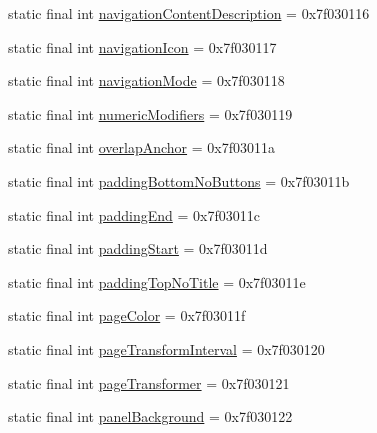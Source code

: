 \begin{DoxyCompactItemize}
\item 
static final int \mbox{\hyperlink{classcom_1_1synnapps_1_1carouselview_1_1_r_1_1attr_a1cccf2566caebbe24264f9612d349a97}{navigation\+Content\+Description}} = 0x7f030116
\item 
static final int \mbox{\hyperlink{classcom_1_1synnapps_1_1carouselview_1_1_r_1_1attr_afcef34f3a69b717d8b25b8b8f076a22e}{navigation\+Icon}} = 0x7f030117
\item 
static final int \mbox{\hyperlink{classcom_1_1synnapps_1_1carouselview_1_1_r_1_1attr_a32f5238c8f67156e168368e807610438}{navigation\+Mode}} = 0x7f030118
\item 
static final int \mbox{\hyperlink{classcom_1_1synnapps_1_1carouselview_1_1_r_1_1attr_aa764b72f4befa2ab6bf5b78f48c212eb}{numeric\+Modifiers}} = 0x7f030119
\item 
static final int \mbox{\hyperlink{classcom_1_1synnapps_1_1carouselview_1_1_r_1_1attr_a243a2a854618c4dfd1e6d94cf8fc0c34}{overlap\+Anchor}} = 0x7f03011a
\item 
static final int \mbox{\hyperlink{classcom_1_1synnapps_1_1carouselview_1_1_r_1_1attr_a9daf774ba2e974a2fe439af281278aab}{padding\+Bottom\+No\+Buttons}} = 0x7f03011b
\item 
static final int \mbox{\hyperlink{classcom_1_1synnapps_1_1carouselview_1_1_r_1_1attr_a7437756496643c845f45a08604ef8764}{padding\+End}} = 0x7f03011c
\item 
static final int \mbox{\hyperlink{classcom_1_1synnapps_1_1carouselview_1_1_r_1_1attr_a8b1c537a481b956fb330179dbc36d745}{padding\+Start}} = 0x7f03011d
\item 
static final int \mbox{\hyperlink{classcom_1_1synnapps_1_1carouselview_1_1_r_1_1attr_a919a133f0bf47b507c227317f190bea2}{padding\+Top\+No\+Title}} = 0x7f03011e
\item 
static final int \mbox{\hyperlink{classcom_1_1synnapps_1_1carouselview_1_1_r_1_1attr_ade0bad39eca01caf7a0c2f3b3158f274}{page\+Color}} = 0x7f03011f
\item 
static final int \mbox{\hyperlink{classcom_1_1synnapps_1_1carouselview_1_1_r_1_1attr_ab501f7de0fdb2c9f03d2f8a0ae52e71c}{page\+Transform\+Interval}} = 0x7f030120
\item 
static final int \mbox{\hyperlink{classcom_1_1synnapps_1_1carouselview_1_1_r_1_1attr_a53e152739d0b92db31d3ceb44bcafe42}{page\+Transformer}} = 0x7f030121
\item 
static final int \mbox{\hyperlink{classcom_1_1synnapps_1_1carouselview_1_1_r_1_1attr_a6a98e8b12b3adca0204d5abe65b5e962}{panel\+Background}} = 0x7f030122

\end{DoxyCompactItemize}
